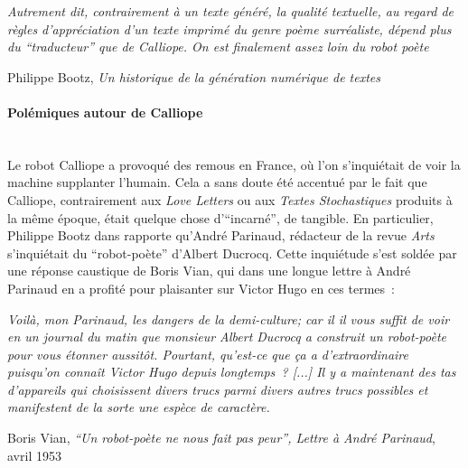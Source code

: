 \documentclass{article}
\newcommand{\subsubsubsection}[1]{\paragraph{#1}\mbox{}\\}
\newenvironment{citationbox}
{\begin{center}
		\begin{minipage}{.8\textwidth}
		}
		{
		\end{minipage}	
\end{center}
}
\begin{document}
					\begin{citationbox}
						\textit{Autrement dit, contrairement à
						un texte généré, la qualité textuelle, au regard de règles d'appréciation d'un texte
						imprimé du genre poème surréaliste, dépend plus du ``traducteur'' que de
						Calliope. On est finalement assez loin du robot poète}
					\begin{flushright}
						Philippe Bootz, \textit{Un historique de la génération numérique de textes} \cite{bootz}
					\end{flushright}
					\end{citationbox}
				\subsubsubsection{Polémiques autour de Calliope}
					Le robot Calliope a provoqué des remous en France, où l'on s'inquiétait de voir la machine supplanter l'humain. Cela a sans doute été accentué par le fait que Calliope, contrairement aux \textit{Love Letters} ou aux \textit{Textes Stochastiques} produits à la même époque, était quelque chose d'``incarné'', de tangible. En particulier, Philippe Bootz dans \cite{bootz} rapporte qu'André Parinaud, rédacteur de la revue \textit{Arts} s'inquiétait du ``robot-poète'' d'Albert Ducrocq. Cette inquiétude s'est soldée par une réponse caustique de Boris Vian, qui dans une longue lettre à André Parinaud en a profité pour plaisanter sur Victor Hugo en ces termes~:
					\begin{citationbox}
						\textit{Voilà, mon Parinaud, les dangers de la demi-culture; car il il vous suffit de voir en un journal du matin que monsieur Albert Ducrocq a construit un robot-poète pour vous étonner aussitôt. Pourtant, qu'est-ce que ça a d'extraordinaire puisqu'on connaît Victor Hugo depuis longtemps~? [...] Il y a maintenant des tas d'appareils qui choisissent divers trucs parmi divers autres trucs possibles et manifestent de la sorte une espèce de caractère.}
						\begin{flushright}
							Boris Vian, \textit{``Un robot-poète ne nous fait pas peur'', Lettre à André Parinaud}, avril 1953  \cite{vian1953}
						\end{flushright}
					\end{citationbox}
					
\end{document}

